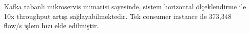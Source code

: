 Kafka tabanlı mikroservis mimarisi sayesinde, sistem horizontal ölçeklendirme ile 10x throughput artışı sağlayabilmektedir. Tek consumer instance ile 373,348 flow/s işlem hızı elde edilmiştir.

